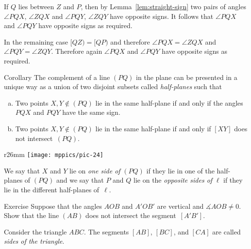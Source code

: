 If $Q$ lies between $Z$ and $P$, then by Lemma~\ref{lem:straight-sign} two pairs of angles $\angle PQX$, $\angle ZQX$ and $\angle PQY$, $\angle ZQY$ have opposite signs. 
It follows that $\angle PQX$ and $\angle PQY$ have opposite signs as required.

In the remaining case $[QZ)=[QP)$ and therefore $\angle PQX=\angle ZQX$ and $\angle PQY=\angle ZQY$. 
Therefore again $\angle PQX$ and $\angle PQY$ have opposite signs as required.
\qeds

\begin{thm}[\abs]{Corollary}\label{cor:half-plane}
The complement of a line $(PQ)$ in the plane 
can be presented in a unique way as a union of two disjoint subsets 
called \emph{half-planes}
such that 
\begin{enumerate}[(a)]
\item\label{cor:half-plane:angle} Two points $X,Y\notin(PQ)$ lie in the same half-plane if and only if the angles $PQX$ and $PQY$ have the same sign.
\item\label{cor:half-plane:intersect} Two points $X,Y\notin(PQ)$ lie in the same half-plane if and only if $[XY]$ does not intersect~$(PQ)$.
\end{enumerate}

\end{thm}

{

\begin{wrapfigure}{r}{26mm}
\vskip-4mm
\centering
\texttt{[image: mppics/pic-24]}
\end{wrapfigure}

We say that $X$ and $Y$ lie on  {}\emph{one side of} $(PQ)$ if they lie in one of the half-planes of $(PQ)$ and we say that  $P$ and $Q$ lie on the {}\emph{opposite sides of} $\ell$ if they lie in the different half-planes of~$\ell$.


\begin{thm}{Exercise}\label{ex:vert-intersect}
Suppose that the angles $AOB$ and $A'OB'$ are vertical and $\measuredangle AOB\ne0$.
Show that the line $(AB)$ does not intersect the segment~$[A'B']$.
\end{thm}

}

Consider the triangle $ABC$.
The segments $[AB]$, $[BC]$, and $[CA]$ are called 
\emph{sides of the triangle}.


